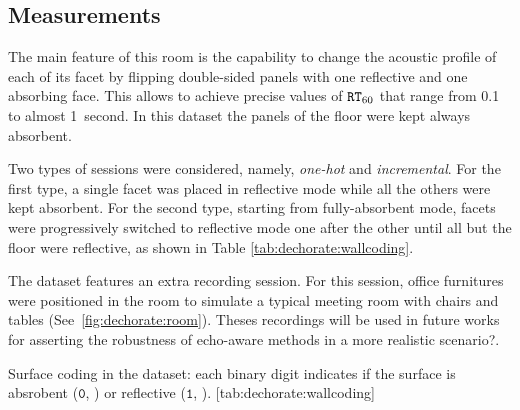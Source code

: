 \subsection{Measurements}
The main feature of this room is the capability to change the acoustic profile of each of its facet by flipping double-sided panels with one reflective and one absorbing face.
This allows to achieve precise values of $\mathtt{RT}_{60}$ that range from 0.1 to almost 1~second.
In this dataset the panels of the floor were kept always absorbent.

\mynewline
Two types of sessions were considered, namely, \textit{one-hot} and \textit{incremental}.
For the first type, a single facet was placed in reflective mode while all the others were kept absorbent.
For the second type, starting from fully-absorbent mode, facets were progressively switched to reflective mode one after the other until all but the floor were reflective, as shown in Table \ref{tab:dechorate:wallcoding}.

\mynewline
The dataset features an extra recording session.
For this session, office furnitures were positioned in the room to simulate a typical meeting room with chairs and tables (See~\cref{fig:dechorate:room}).
Theses recordings will be used in future works for asserting the robustness of echo-aware methods in a more realistic scenario?.

\begin{table}[h]
    \begin{sidecaption}[]{
        Surface coding in the dataset: each binary digit indicates if the surface is absrobent ($\mathtt{0}$, \xmark ) or reflective ($\mathtt{1}$, \cmark).
        }[tab:dechorate:wallcoding]
        \centering
        \small
        
    \end{sidecaption}
\end{table}


